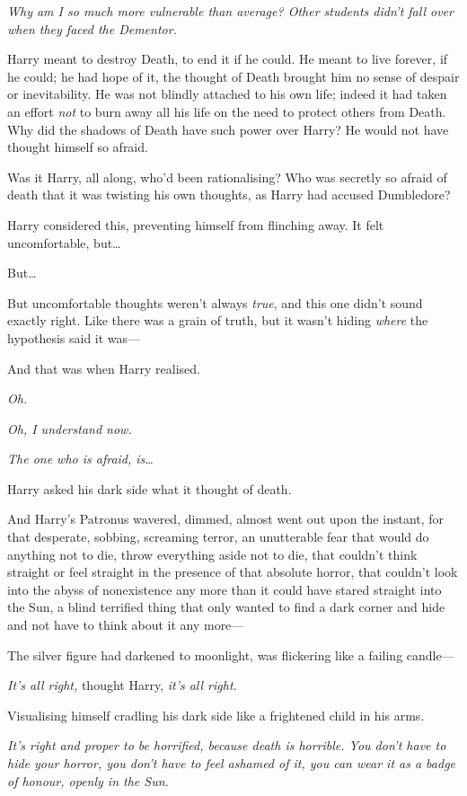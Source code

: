 \emph{Why am I so much more vulnerable than average? Other students
didn't fall over when they faced the Dementor.}

Harry meant to destroy Death, to end it if he could. He meant to live
forever, if he could; he had hope of it, the thought of Death brought
him no sense of despair or inevitability. He was not blindly attached to
his own life; indeed it had taken an effort \emph{not} to burn away all
his life on the need to protect others from Death. Why did the shadows
of Death have such power over Harry? He would not have thought himself
so afraid.

Was it Harry, all along, who'd been rationalising? Who was secretly so
afraid of death that it was twisting his own thoughts, as Harry had
accused Dumbledore?

Harry considered this, preventing himself from flinching away. It felt
uncomfortable, but\ldots{}

But\ldots{}

But uncomfortable thoughts weren't always \emph{true}, and this one
didn't sound exactly right. Like there was a grain of truth, but it
wasn't hiding \emph{where} the hypothesis said it was---

And that was when Harry realised.

\emph{Oh.}

\emph{Oh, I understand now.}

\emph{The one who is afraid, is\ldots{}}

Harry asked his dark side what it thought of death.

And Harry's Patronus wavered, dimmed, almost went out upon the instant,
for that desperate, sobbing, screaming terror, an unutterable fear that
would do anything not to die, throw everything aside not to die, that
couldn't think straight or feel straight in the presence of that
absolute horror, that couldn't look into the abyss of nonexistence any
more than it could have stared straight into the Sun, a blind terrified
thing that only wanted to find a dark corner and hide and not have to
think about it any more---

The silver figure had darkened to moonlight, was flickering like a
failing candle---

\emph{It's all right,} thought Harry, \emph{it's all right.}

Visualising himself cradling his dark side like a frightened child in
his arms.

\emph{It's right and proper to be horrified, because death is horrible.
You don't have to hide your horror, you don't have to feel ashamed of
it, you can wear it as a badge of honour, openly in the Sun.}

